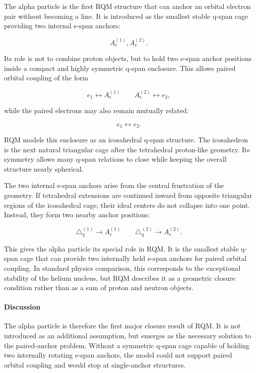 \documentclass[11pt,a4paper]{article}
\begin{document}
The alpha particle is the first RQM structure that can anchor an orbital electron pair without becoming a line. It is introduced as the smallest stable q-span cage providing two internal e-span anchors:

\[
A_e^{(1)}, A_e^{(2)} .
\]

Its role is not to combine proton objects, but to hold two e-span anchor positions inside a compact and highly symmetric q-span enclosure. This allows paired orbital coupling of the form

\[
e_1 \leftrightarrow A_e^{(1)}
\qquad
A_e^{(2)} \leftrightarrow e_2 ,
\]

while the paired electrons may also remain mutually related:

\[
e_1 \leftrightarrow e_2 .
\]

RQM models this enclosure as an icosahedral q-span structure. The icosahedron is the next natural triangular cage after the tetrahedral proton-like geometry. Its symmetry allows many q-span relations to close while keeping the overall structure nearly spherical.

The two internal e-span anchors arise from the central frustration of the geometry. If tetrahedral extensions are continued inward from opposite triangular regions of the icosahedral cage, their ideal centers do not collapse into one point. Instead, they form two nearby anchor positions:

\[
\triangle_q^{(1)} \rightarrow A_e^{(1)}
\qquad
\triangle_q^{(2)} \rightarrow A_e^{(2)} .
\]

This gives the alpha particle its special role in RQM. It is the smallest stable q-span cage that can provide two internally held e-span anchors for paired orbital coupling. In standard physics comparison, this corresponds to the exceptional stability of the helium nucleus, but RQM describes it as a geometric closure condition rather than as a sum of proton and neutron objects.


\paragraph{Discussion}

The alpha particle is therefore the first major closure result of RQM. It is not introduced as an additional assumption, but emerges as the necessary solution to the paired-anchor problem. Without a symmetric q-span cage capable of holding two internally rotating e-span anchors, the model could not support paired orbital coupling and would stop at single-anchor structures.
\end{document}
